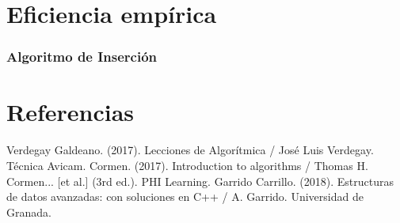 \documentclass[8pt, aspectratio=169]{beamer}
\begin{document}
            
        

    \section{Eficiencia empírica}

    \begin{frame}
        \frametitle{Algoritmo de Inserción}

        
    \end{frame}

    \section{Referencias}

    \begin{frame}
        \begin{thebibliography}{0}
             Verdegay Galdeano. (2017). Lecciones de Algorítmica / José Luis Verdegay. Técnica Avicam.
             Cormen. (2017). Introduction to algorithms / Thomas H. Cormen... [et al.] (3rd ed.). PHI Learning.
             Garrido Carrillo. (2018). Estructuras de datos avanzadas: con soluciones en C++ / A. Garrido. Universidad de Granada.        
        \end{thebibliography}
    \end{frame}
    

	
\end{document}
